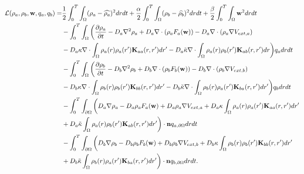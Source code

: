 	\begin{align*}
	\mathcal{L}(\rho_a,\rho_b, \mathbf{w}, q_a, q_b) =& \frac{1}{2}\int_0^T \int_\Omega ( \rho_a - \widehat{\rho_a})^2 dr dt + \frac{\alpha}{2}\int_0^T \int_\Omega ( \rho_b - \widehat{\rho_b})^2 dr dt + \frac{\beta}{2}\int_0^T \int_\Omega \mathbf{w}^2 dr dt\\
	& - \int_0^T \int_\Omega \bigg(\frac{\partial \rho_a}{\partial t} - D_a\nabla^2 \rho_a + D_a\nabla \cdot(\rho_a F_a(\mathbf{w})) - D_a \nabla \cdot (\rho_a \nabla V_{ext,a})\\
	& - D_a\kappa \nabla \cdot \int_\Omega \rho_a(r) \rho_a (r') \mathbf{K}_{aa}(r,r')dr' - D_a\tilde{\kappa} \nabla \cdot \int_\Omega \rho_a(r) \rho_b (r') \mathbf{K}_{ab}(r,r')dr\bigg)q_a dr dt \\
	& - \int_0^T \int_\Omega \bigg(
	\frac{\partial \rho_b}{\partial t} - D_b\nabla^2 \rho_b + D_b\nabla \cdot(\rho_b F_b(\mathbf{w})) - D_b \nabla \cdot (\rho_b \nabla V_{ext,b}) \\
	&- D_b\kappa \nabla \cdot \int_\Omega \rho_b(r) \rho_b (r') \mathbf{K}_{bb}(r,r')dr'
	-  D_b\tilde{\kappa} \nabla \cdot \int_\Omega \rho_b(r) \rho_a (r')\mathbf{K}_{ba}(r,r')dr'\bigg) q_b dr dt\\
	&- \int_0^T \int_{\partial \Omega} \bigg( D_a \nabla \rho_a - D_a \rho_a F_a(\mathbf{w}) + D_a \rho_a \nabla V_{ext,a} + D_a\kappa \int_\Omega \rho_a(r) \rho_a (r') \mathbf{K}_{aa}(r,r')dr' \\
	&+  D_a\tilde{\kappa} \int_\Omega \rho_a(r) \rho_b (r') \mathbf{K}_{ab}(r,r')dr' \bigg) \cdot \mathbf{n} q_{a,\partial \Omega} dr dt\\
	& - \int_0^T \int_{\partial \Omega} \bigg( D_b \nabla \rho_b - D_b \rho_b F_b(\mathbf{w}) + D_b \rho_b \nabla V_{ext,b} + D_b\kappa \int_\Omega \rho_b(r) \rho_b (r')\mathbf{K}_{bb}(r,r')dr' \\
	&+  D_b\tilde{\kappa} \int_\Omega \rho_b(r) \rho_a (r') \mathbf{K}_{ba}(r,r')dr' \bigg) \cdot \mathbf{n} q_{b,\partial \Omega} dr dt.
	\end{align*}
